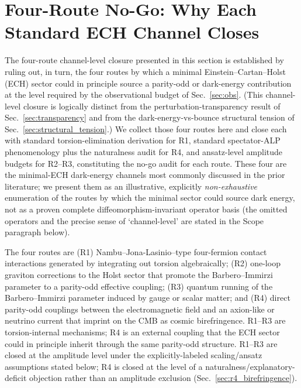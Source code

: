 \documentclass[aps,prd,twocolumn,superscriptaddress,showpacs,preprintnumbers,nofootinbib,longbibliography,floatfix]{revtex4-2}
\begin{document}
\section{Four-Route No-Go: Why Each Standard ECH Channel Closes}\label{sec:derivations}
\label{sec:fourroute}
\label{sec:oneloopfull}\label{sec:condensate}\label{sec:cosmo_derivation}

The four-route channel-level closure presented in this section is
established by ruling out, in turn, the four routes by which a minimal
Einstein--Cartan--Holst (ECH) sector could in principle source a parity-odd
or dark-energy contribution at the level required by the observational
budget of Sec.~\ref{sec:obs}. (This channel-level closure is logically
distinct from the perturbation-transparency result of
Sec.~\ref{sec:transparency} and from the dark-energy-vs-bounce structural
tension of Sec.~\ref{sec:structural_tension}.) We collect those four routes here and close each
with standard torsion-elimination derivation for R1, standard spectator-ALP phenomenology plus the naturalness audit for R4, and ansatz-level amplitude budgets for R2--R3, constituting the no-go audit for each route.
These four are the minimal-ECH dark-energy channels most commonly discussed
in the prior literature; we present them as an illustrative, explicitly
\emph{non-exhaustive} enumeration of the routes by which the minimal sector
could source dark energy, not as a proven complete diffeomorphism-invariant
operator basis (the omitted operators and the precise sense of `channel-level'
are stated in the Scope paragraph below).

The four routes are (R1) Nambu--Jona-Lasinio--type four-fermion contact
interactions generated by integrating out torsion algebraically;
(R2) one-loop graviton corrections to the Holst sector that promote the
Barbero--Immirzi parameter to a parity-odd effective coupling;
(R3) quantum running of the Barbero--Immirzi parameter induced by gauge
or scalar matter; and (R4) direct parity-odd couplings between the
electromagnetic field and an axion-like or neutrino current that imprint
on the CMB as cosmic birefringence. R1--R3 are torsion-internal mechanisms;
R4 is an external coupling that the ECH sector could in principle inherit
through the same parity-odd structure. R1--R3 are closed at the
amplitude level under the explicitly-labeled scaling/ansatz assumptions
stated below; R4 is closed at the level of a naturalness/explanatory-deficit
objection rather than an amplitude exclusion
(Sec.~\ref{sec:r4_birefringence}).
\end{document}
